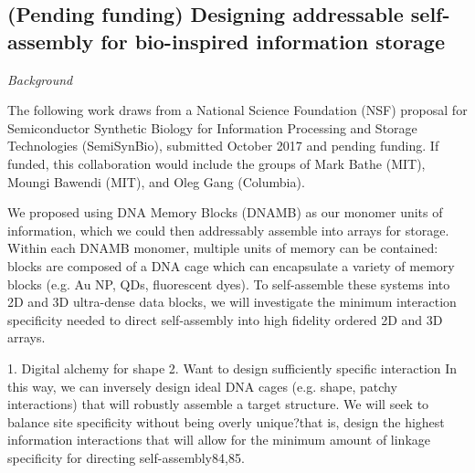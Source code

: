 \subsection{(Pending funding) Designing addressable self-assembly for bio-inspired information storage}


\textit{Background}

The following work draws from a National Science Foundation (NSF) proposal for Semiconductor Synthetic Biology for Information Processing and Storage Technologies (SemiSynBio), submitted October 2017 and pending funding.
If funded, this collaboration would include the groups of Mark Bathe (MIT), Moungi Bawendi (MIT), and Oleg Gang (Columbia).

We proposed using DNA Memory Blocks (DNAMB) as our monomer units of information, which we could then addressably assemble into arrays for storage. 
Within each DNAMB monomer, multiple units of memory can be contained: blocks are composed of a DNA cage which can encapsulate a variety of memory blocks (e.g. Au NP, QDs, fluorescent dyes).
To self-assemble these systems into 2D and 3D ultra-dense data blocks, we will investigate the minimum interaction specificity needed to direct self-assembly into high fidelity ordered 2D and 3D arrays.

1. Digital alchemy for shape
2. Want to design sufficiently specific interaction
In this way, we can inversely design ideal DNA cages (e.g. shape, patchy interactions) that will robustly assemble a target structure. We will seek to balance site specificity without being overly unique?that is, design the highest information interactions that will allow for the minimum amount of linkage specificity for directing self-assembly84,85.

